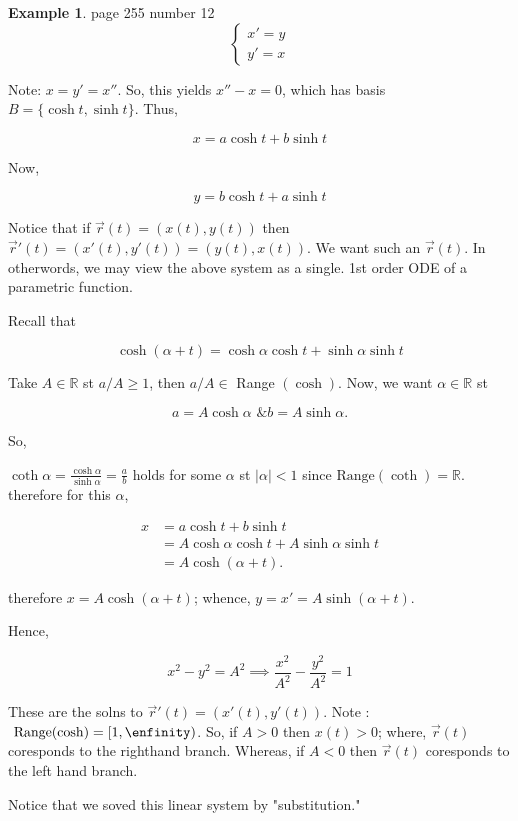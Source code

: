 \documentclass[12pt,a4paper]{article}
\theoremstyle{definition}
\newtheorem*{example}{Example}
\begin{document}
\begin{example}
  page 255 number 12 \\ 

  \[ 
  \begin{cases}
    x' = y  \\
    y' = x 
  \end{cases}
  \]

  Note: \( x = y' = x'' \). So, this yields \( x'' - x = 0 \), which has
  basis \( B = \{ \cosh t, \sinh t \} \). Thus, 

  \[ x = a \cosh t + b \sinh t \]

  Now, 

  \[ y =  b \cosh t + a \sinh t\]

  Notice that if \( \vec{r}(t) = (x(t), y(t))  \) then \( \vec{r}'(t) =
  (x'(t), y'(t)) = (y(t), x(t))  \). We want such an \( \vec{r}(t)  \). In otherwords,
  we may view the above system as a single. 1st order ODE of a
  parametric function. 

  Recall that 

  \[ \cosh (\alpha + t) = \cosh \alpha \cosh t + \sinh \alpha \sinh t \]

  Take \( A \in \mathbb{R} \) st \( a/A \geq 1 \), then \( a/A \in \)
  Range \( (\cosh)\). Now, we want \( \alpha \in \mathbb{R} \) st

  \[ a = A \cosh \alpha \text{ \& }  b = A \sinh \alpha.\]

  So, 

  \( \coth \alpha = \frac{ \cosh \alpha}{ \sinh \alpha} = \frac{a}{b} \)
  holds for some \( \alpha \) st \( |\alpha| < 1 \) since \( \text{
  Range} (\coth) = \mathbb{R} \). therefore for this \( \alpha \), 

  \begin{align*}
    x &=  a \cosh t + b \sinh t \\
    &= A \cosh \alpha \cosh t + A \sinh \alpha \sinh t \\
    &= A \cosh (\alpha + t).
  \end{align*}

  therefore \( x = A \cosh (\alpha + t) \); whence, \( y = x' = A \sinh
  (\alpha + t).\)

  Hence, 

  \[ x^2 - y^2 = A^2 \implies \frac{x^2}{A^2} - \frac{y^2}{A^2} = 1 \]

  These are the solns to \( \vec{r}'(t) = (x'(t), y'(t)).  \) Note : \(
  \text{ Range} (\cosh) = [1,\enfinity)\). So, if \( A > 0 \) then \( x(t)
  > 0\); where, \( \vec{r}(t) \) coresponds to the righthand branch.
  Whereas, if \( A<0 \) then \( \vec{r}(t) \) coresponds to the left hand
  branch. 

  Notice that we soved this linear system by "substitution." 

\end{example}
\end{document}
